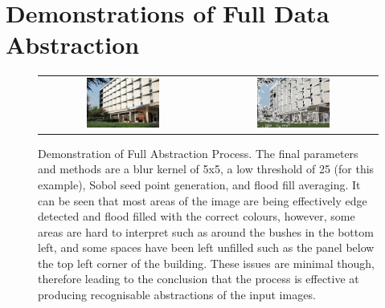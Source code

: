 \chapter{Demonstrations of Full Data Abstraction}
\label{Appendix:demo}

\begin{figure}[h]
    \begin{center}
    \begin{tabular}{ c c }
        \includegraphics[width=0.45\textwidth]{Figures/building.jpg} &
        \includegraphics[width=0.45\textwidth]{Figures/Final.jpg} \\
    \end{tabular}
    \caption[Demonstration of Full Abstraction Process]{Demonstration of Full Abstraction Process. The final parameters and methods are a blur kernel of 5x5, a low threshold of 25 (for this example), Sobol seed point generation, and flood fill averaging. It can be seen that most areas of the image are being effectively edge detected and flood filled with the correct colours, however, some areas are hard to interpret such as around the bushes in the bottom left, and some spaces have been left unfilled such as the panel below the top left corner of the building. These issues are minimal though, therefore leading to the conclusion that the process is effective at producing recognisable abstractions of the input images.}
    \label{fig:Final}
    \end{center}
\end{figure}
        
